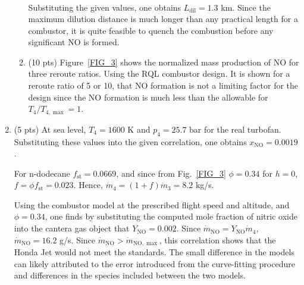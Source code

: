 \documentclass[12pt]{article}
\begin{document}
\begin{enumerate}[label=(\alph*)]
\begin{enumerate}
\begin{equation}
\begin{aligned}
						\end{aligned}
					\end{equation}
					Substituting the given values, one obtains $\boxed{L_\mathrm{dil}=1.3}$ km. Since the maximum dilution distance is much longer than any practical length for a combustor, it is quite feasible to quench the combustion before any significant NO is formed.
				\item (10 pts)
					Figure~\ref{FIG_3} shows the normalized mass production of NO for three reroute ratios. Using the RQL combustor design. It is shown for a reroute ratio of 5 or 10, that NO formation is not a limiting factor for the design since the NO formation is much less than the allowable for $T_4/T_{4,\max}=1$.
			\end{enumerate}
		\item (5 pts)
			At sea level, $T_4=1600$ K and $p_4=25.7$ bar for the real turbofan. Substituting these values into the given correlation, one obtains $\boxed{x_\mathrm{NO}=0.0019}$.
			
			For n-dodecane $f_\mathrm{st}=0.0669$, and since from Fig.~\ref{FIG_3} $\phi=0.34$ for $h=0$, $f=\phi f_\mathrm{st}=0.023$. Hence, $\dot{m}_4=(1+f)\dot{m}_3=8.2$ kg/s.
			
			Using the combustor model at the prescribed flight speed and altitude, and $\phi=0.34$, one finds by substituting the computed mole fraction of nitric oxide into the cantera gas object that $Y_\mathrm{NO}=0.002$. Since $\dot{m}_\mathrm{NO}=Y_\mathrm{NO}\dot{m}_4$, $\boxed{\dot{m}_\mathrm{NO}=16.2}$ g/s. Since $\dot{m}_\mathrm{NO}>\dot{m}_{\mathrm{NO},\max}$, this correlation shows that the Honda Jet would not meet the standards. The small difference in the models can likely attributed to the error introduced from the curve-fitting procedure and differences in the species included between the two models. 
	\end{enumerate}
			
\end{document}
